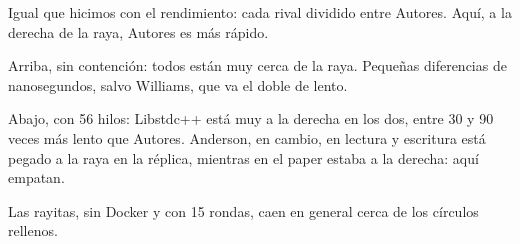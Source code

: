 Igual que hicimos con el rendimiento: cada rival dividido entre Autores. Aquí, a la derecha de la raya, Autores es más rápido.

Arriba, sin contención: todos están muy cerca de la raya. Pequeñas diferencias de nanosegundos, salvo Williams, que va el doble de lento.

Abajo, con 56 hilos: Libstdc++ está muy a la derecha en los dos, entre 30 y 90 veces más lento que Autores. Anderson, en cambio, en lectura y escritura está pegado a la raya en la réplica, mientras en el paper estaba a la derecha: aquí empatan.

Las rayitas, sin Docker y con 15 rondas, caen en general cerca de los círculos rellenos.
